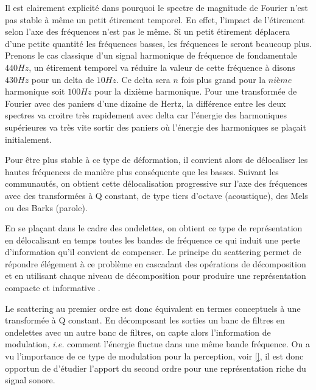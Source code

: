 Il est clairement explicité dans\cite{anden2014deep} pourquoi le spectre de magnitude de Fourier n'est pas stable à même un petit étirement temporel. En effet, l'impact de l'étirement selon l'axe des fréquences n'est pas le même. Si un petit étirement déplacera d'une petite quantité les fréquences basses, les fréquences le seront beaucoup plus. Prenons le cas classique d'un signal harmonique de fréquence de fondamentale $440 Hz$, un étirement temporel va réduire la valeur de cette fréquence à disons $430 Hz$ pour un delta de $10 Hz$. Ce delta sera $n$ fois plus grand pour la $nième$ harmonique soit $100 Hz$ pour la dixième harmonique. Pour une transformée de Fourier avec des paniers d'une dizaine de Hertz, la différence entre les deux spectres va croitre très rapidement avec delta car l'énergie des harmoniques supérieures va très vite sortir des paniers où l'énergie des harmoniques se plaçait initialement.

Pour être plus stable à ce type de déformation, il convient alors de \og délocaliser \fg les hautes fréquences de manière plus conséquente que les basses. Suivant les communautés, on obtient cette délocalisation progressive sur l'axe des fréquences avec des transformées à Q constant, de type tiers d'octave (acoustique), des Mels ou des Barks (parole).

En se plaçant dans le cadre des ondelettes, on obtient ce type de représentation en délocalisant en temps toutes les bandes de fréquence ce qui induit une perte d'information qu'il convient de compenser. Le principe du scattering permet de répondre élégement à ce problème en cascadant des opérations de décomposition et en utilisant chaque niveau de décomposition pour produire une représentation compacte et informative .

Le scattering au premier ordre est donc équivalent en termes conceptuels à une transformée à Q constant. En décomposant les sorties un banc de filtres en ondelettes avec un autre banc de filtres, on capte alors l'information de modulation, \textit{i.e.} comment l'énergie fluctue dans une même bande fréquence. On a vu l'importance de ce type de modulation pour la perception, voir \ref{}, il est donc opportun de d'étudier l'apport du second ordre pour une représentation riche du signal sonore.

